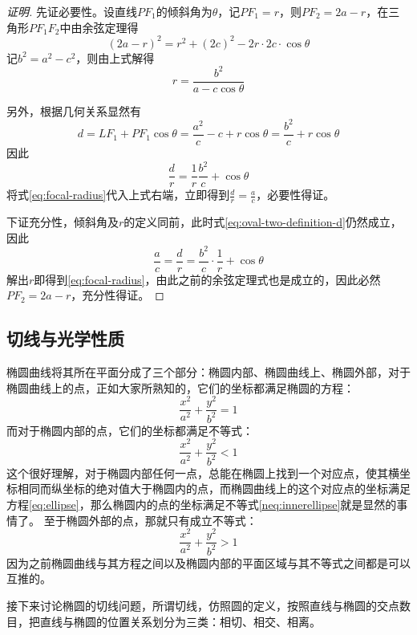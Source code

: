\begin{proof}[证明]
 先证必要性。设直线$PF_1$的倾斜角为$\theta$，记$PF_1=r$，则$PF_2=2a-r$，在三角形$PF_1F_2$中由余弦定理得
\[ (2a-r)^2=r^2+(2c)^2-2r \cdot 2c \cdot \cos{\theta} \]
记$b^2=a^2-c^2$，则由上式解得
\begin{equation}
\label{eq:focal-radius}
r=\frac{b^2}{a-c\cos{\theta}}
\end{equation}

另外，根据几何关系显然有
\begin{equation}
  \label{eq:oval-two-definition-d}
 d=LF_1+PF_1\cos{\theta}=\frac{a^2}{c}-c+r\cos{\theta}=\frac{b^2}{c}+r\cos{\theta} 
\end{equation}
因此
\[ \frac{d}{r}=\frac{1}{r}\frac{b^2}{c}+\cos{\theta} \] 
将式\ref{eq:focal-radius}代入上式右端，立即得到$\frac{d}{r}=\frac{a}{c}$，必要性得证。

下证充分性，倾斜角及$r$的定义同前，此时式\ref{eq:oval-two-definition-d}仍然成立，因此
\[ \frac{a}{c}=\frac{d}{r}=\frac{b^2}{c} \cdot \frac{1}{r}+\cos{\theta} \]
解出$r$即得到\ref{eq:focal-radius}，由此之前的余弦定理式也是成立的，因此必然$PF_2=2a-r$，充分性得证。
\end{proof}

\subsection{切线与光学性质}
\label{sec:oval-tangent}

椭圆曲线将其所在平面分成了三个部分：椭圆内部、椭圆曲线上、椭圆外部，对于椭圆曲线上的点，正如大家所熟知的，它们的坐标都满足椭圆的方程：
\begin{equation}
\frac{x^2}{a^2}+\frac{y^2}{b^2}=1 \label{eq:ellipse}
\end{equation}
而对于椭圆内部的点，它们的坐标都满足不等式：
\begin{equation}
\frac{x^2}{a^2}+\frac{y^2}{b^2}<1 \label{neq:innerellipse}
\end{equation}
这个很好理解，对于椭圆内部任何一点，总能在椭圆上找到一个对应点，使其横坐标相同而纵坐标的绝对值大于椭圆内的点，而椭圆曲线上的这个对应点的坐标满足方程\ref{eq:ellipse}，那么椭圆内的点的坐标满足不等式\ref{neq:innerellipse}就是显然的事情了。
至于椭圆外部的点，那就只有成立不等式：
\begin{equation}
\frac{x^2}{a^2}+\frac{y^2}{b^2}>1 \label{neq:outerellipse}
\end{equation}
因为之前椭圆曲线与其方程之间以及椭圆内部的平面区域与其不等式之间都是可以互推的。

接下来讨论椭圆的切线问题，所谓切线，仿照圆的定义，按照直线与椭圆的交点数目，把直线与椭圆的位置关系划分为三类：相切、相交、相离。


